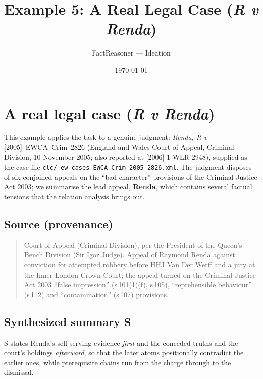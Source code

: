 \documentclass[11pt]{article}
\title{Example 5: A Real Legal Case (\emph{R v Renda})}
\author{FactReasoner --- Ideation}
\date{\today}
\begin{document}
\maketitle
\section{A real legal case (\emph{R v Renda})}

This example applies the task to a genuine judgment: \emph{Renda, R v}
\mbox{[2005] EWCA Crim 2826} (England and Wales Court of Appeal, Criminal
Division, 10 November 2005; also reported at [2006] 1 WLR 2948), supplied as the
case file \texttt{clc/-ew-cases-EWCA-Crim-2005-2826.xml}. The judgment disposes
of six conjoined appeals on the ``bad character'' provisions of the Criminal
Justice Act 2003; we summarise the lead appeal, \textbf{Renda}, which contains
several factual tensions that the relation analysis brings out.

\subsection*{Source (provenance)}
\begin{quote}\small
Court of Appeal (Criminal Division), per the President of the Queen's Bench
Division (Sir Igor Judge). Appeal of Raymond Renda against conviction for
attempted robbery before HHJ Van Der Werff and a jury at the Inner London Crown
Court; the appeal turned on the Criminal Justice Act 2003 ``false impression''
(s\,101(1)(f), s\,105), ``reprehensible behaviour'' (s\,112) and
``contamination'' (s\,107) provisions.
\end{quote}

\subsection*{Synthesized summary S}

S states Renda's self-serving evidence \emph{first} and the conceded truths and
the court's holdings \emph{afterward}, so that the later atoms positionally
contradict the earlier ones, while prerequisite chains run from the charge
through to the dismissal.
\end{document}
